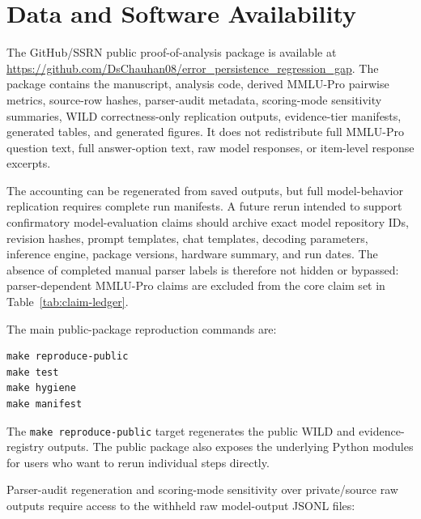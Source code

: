 \documentclass[manuscript, screen, review, nonacm]{jair}
\begin{document}
\section{Data and Software Availability}

The GitHub/SSRN public proof-of-analysis package is available at \url{https://github.com/DsChauhan08/error_persistence_regression_gap}. The package contains the manuscript, analysis code, derived MMLU-Pro pairwise metrics, source-row hashes, parser-audit metadata, scoring-mode sensitivity summaries, WILD correctness-only replication outputs, evidence-tier manifests, generated tables, and generated figures. It does not redistribute full MMLU-Pro question text, full answer-option text, raw model responses, or item-level response excerpts.

\begin{table}[t]
\centering
\small
\resizebox{\linewidth}{!}{}
\caption{Artifact availability and claim scope. Parser validation and MMLU-Pro confirmatory status remain visible but do not block the parser-independent WILD/source-manifest claim set for this software-tool article.}
\label{tab:artifact-release-status}
\end{table}

The accounting can be regenerated from saved outputs, but full model-behavior replication requires complete run manifests. A future rerun intended to support confirmatory model-evaluation claims should archive exact model repository IDs, revision hashes, prompt templates, chat templates, decoding parameters, inference engine, package versions, hardware summary, and run dates. The absence of completed manual parser labels is therefore not hidden or bypassed: parser-dependent MMLU-Pro claims are excluded from the core claim set in Table~\ref{tab:claim-ledger}.

The main public-package reproduction commands are:

\begin{verbatim}
make reproduce-public
make test
make hygiene
make manifest
\end{verbatim}

The \texttt{make reproduce-public} target regenerates the public WILD and evidence-registry outputs. The public package also exposes the underlying Python modules for users who want to rerun individual steps directly.

Parser-audit regeneration and scoring-mode sensitivity over private/source raw outputs require access to the withheld raw model-output JSONL files:
\end{document}
